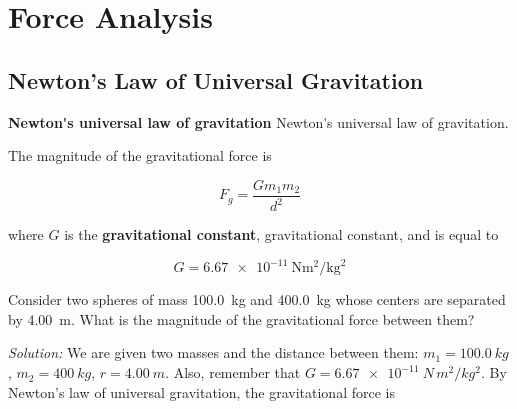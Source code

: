 \documentclass[dvipsnames]{article}
\newif\ifShowUnitV
\begin{document}
\fi

\clearpage

\section{Force Analysis}

\ifShowUnitV
\setcounter{example}{0}

\subsection{Newton's Law of Universal Gravitation}

\textbf{\gls{Newton's universal law of gravitation}} \glsdesc{Newton's universal law of gravitation}.

\begin{center}
\end{center}

The magnitude of the gravitational force is

\begin{equation*}
    F_g  = \frac{G m_1 m_2}{d^2}
\end{equation*}

where $G$ is the \textbf{\gls{gravitational constant}}, \glsdesc{gravitational constant}, and is equal to

\begin{equation*}
    G = \SI[per-mode=fraction]{6.67e-11}{\newton\meter\tothe{2}\per\kilogram\tothe{2}}
\end{equation*}

\begin{example}
Consider two spheres of mass \SI{100.0}{kg} and \SI{400.0}{kg} whose centers are separated by \SI{4.00}{m}. What is the magnitude of the gravitational force between them?
\end{example}

\textit{Solution:}
We are given two masses and the distance between them: $m_1 = \SI{100.0}{kg}$, $m_2 = \SI{400}{kg}$, $r = \SI{4.00}{m}$. Also, remember that $G = \SI{6.67e-11}{N\,m^2/kg^2}$. By Newton's law of universal gravitation, the gravitational force is
\end{document}
